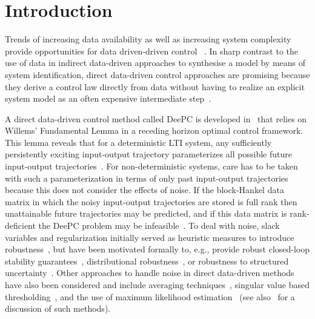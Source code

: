 \section{Introduction}
Trends of increasing data availability as well as increasing system complexity provide opportunities for data driven-driven control%
~\citep{Hou2013}. In sharp contrast to the use of data in %
indirect data-driven approaches to synthesise a model by means of system identification, direct data-driven control approaches are promising because they derive a control law directly from data without having to realize an explicit system model as an often expensive intermediate step~\citep{Hjalmarsson2005}.

A direct data-driven control method called \ac{DeePC} is developed in~\cite{Coulson2019} that relies on Willems' Fundamental Lemma in a receding horizon optimal control framework. This lemma reveals that for a deterministic \ac{LTI} system, any sufficiently persistently exciting input-output trajectory parameterizes all possible future input-output trajectories~\citep{Willems2005}.%
% 
For non-deterministic systems, care has to be taken with such a parameterization in terms of only past input-output trajectories because this does not consider the effects of noise. If the block-Hankel data matrix in which the noisy input-output trajectories are stored is full rank then unattainable future trajectories may be predicted, and if this data matrix is rank-deficient the \ac{DeePC} problem may be infeasible~\citep{Markovsky2022}. To deal with noise, slack variables and regularization initially served as heuristic measures to introduce robustness~\citep{Coulson2019}, but have been motivated formally to, e.g., provide robust closed-loop stability guarantees~\citep{Berberich2021}, distributional robustness~\citep{Coulson2019a}, or robustness to structured uncertainty~\citep{Huang2023}. Other approaches to handle noise in direct data-driven methods have also been considered and include averaging techniques~\citep{Jo2022}, singular value based thresholding~\citep{Sassella2022}, and the use of maximum likelihood estimation~\citep{Yin2023} (see also~\cite{Sassella2023} for a discussion of such methods). 

